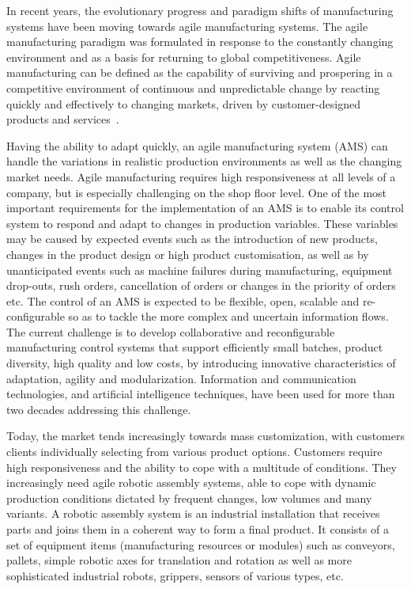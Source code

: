 \label{chapter:INTRODUCTION}

In recent years, the evolutionary progress and paradigm shifts of manufacturing systems have been moving towards agile manufacturing systems. The agile manufacturing paradigm was formulated in response to the constantly changing environment and as a basis for returning to global competitiveness. Agile manufacturing can be defined as the capability of surviving and prospering in a competitive environment of continuous and unpredictable change by reacting quickly and effectively to changing markets, driven by customer-designed products and services~\cite{Cunha.2007,CHO.CIE.1996,GUNASEKARAN.1999}.

Having the ability to adapt quickly, an agile manufacturing system (AMS) can handle the variations in realistic production
environments as well as the changing market needs. Agile manufacturing requires high responsiveness at all levels of a company, but is especially challenging on the shop floor level. One of the most important requirements for the implementation of an AMS is to enable its control system to respond and adapt to changes in production variables. These variables may be caused by expected events such as the introduction of new products, changes in the product design or high product customisation, as well as by unanticipated events such as machine failures during manufacturing, equipment drop-outs, rush orders, cancellation of orders or changes in the priority of orders etc. The control of an AMS is expected to be flexible, open, scalable and re-configurable so as to tackle the more complex and uncertain information flows. The current challenge is to develop collaborative and reconfigurable manufacturing control systems that support efficiently small batches, product diversity, high quality and low costs, by introducing innovative characteristics of adaptation, agility and modularization. Information and communication technologies, and artificial intelligence techniques, have been used for more than two decades addressing this challenge.

Today, the market tends increasingly towards mass customization, with customers clients individually selecting from various product options. Customers require high responsiveness and the ability to cope with a multitude of conditions. They increasingly need agile robotic assembly systems, able to
cope with dynamic production conditions dictated by frequent changes, low volumes and many variants. A robotic assembly system is an industrial installation that receives parts and joins them in a coherent way to form a final product. It consists of a set of equipment items (manufacturing resources or modules) such as conveyors, pallets, simple robotic axes for translation and rotation as well as more sophisticated industrial robots, grippers, sensors of various types, etc.

